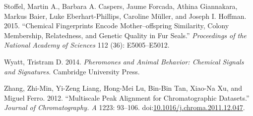 \documentclass[]{article}
\begin{document}
\hypertarget{ref-Stoffel.2015}{}
Stoffel, Martin A., Barbara A. Caspers, Jaume Forcada, Athina
Giannakara, Markus Baier, Luke Eberhart-Phillips, Caroline Müller, and
Joseph I. Hoffman. 2015. ``Chemical Fingerprints Encode
Mother--offspring Similarity, Colony Membership, Relatedness, and
Genetic Quality in Fur Seals.'' \emph{Proceedings of the National
Academy of Sciences} 112 (36): E5005--E5012.

\hypertarget{ref-Wyatt.2014}{}
Wyatt, Tristram D. 2014. \emph{Pheromones and Animal Behavior: Chemical
Signals and Signatures}. Cambridge University Press.

\hypertarget{ref-Zhang.2012}{}
Zhang, Zhi-Min, Yi-Zeng Liang, Hong-Mei Lu, Bin-Bin Tan, Xiao-Na Xu, and
Miguel Ferro. 2012. ``Multiscale Peak Alignment for Chromatographic
Datasets.'' \emph{Journal of Chromatography. A} 1223: 93--106.
doi:\href{https://doi.org/10.1016/j.chroma.2011.12.047}{10.1016/j.chroma.2011.12.047}.
\end{document}
